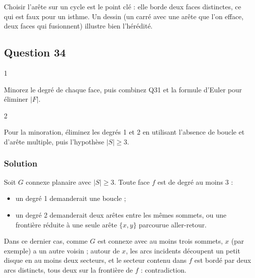\documentclass[11pt,a4paper]{article}
\providecommand{\tightlist}{\setlength{\itemsep}{0pt}\setlength{\parskip}{0pt}}
\begin{document}
\begin{methode}

Choisir l'arête sur un cycle est le point clé : elle borde deux faces distinctes, ce qui est faux pour un isthme. Un dessin (un carré avec une arête que l'on efface, deux faces qui fusionnent) illustre bien l'hérédité.

\end{methode}

\hypertarget{question-34}{%
\subsection{Question 34}\label{question-34}}

\begin{indication}{1}

Minorez le degré de chaque face, puis combinez Q31 et la formule d'Euler pour éliminer \(|F|\).

\end{indication}

\begin{indication}{2}

Pour la minoration, éliminez les degrés 1 et 2 en utilisant l'absence de boucle et d'arête multiple, puis l'hypothèse \(|S| \ge 3\).

\end{indication}

\hypertarget{solution-33}{%
\subsubsection{Solution}\label{solution-33}}

Soit \(G\) connexe planaire avec \(|S| \ge 3\). Toute face \(f\) est de degré au moins 3 :

\begin{itemize}
\tightlist
\item
  un degré 1 demanderait une boucle ;
\item
  un degré 2 demanderait deux arêtes entre les mêmes sommets, ou une frontière réduite à une seule arête \(\{x, y\}\) parcourue aller-retour.
\end{itemize}

Dans ce dernier cas, comme \(G\) est connexe avec au moins trois sommets, \(x\) (par exemple) a un autre voisin ; autour de \(x\), les arcs incidents découpent un petit disque en au moins deux secteurs, et le secteur contenu dans \(f\) est bordé par deux arcs distincts, tous deux sur la frontière de \(f\) : contradiction.
\end{document}

